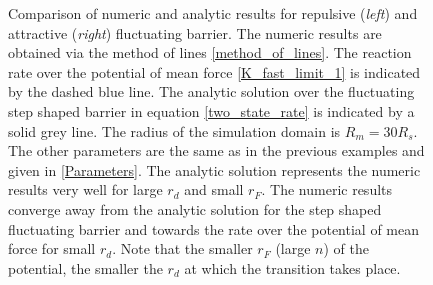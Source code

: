 \begin{minipage}[t]{1 \textwidth}
    \begin{figure}[H]
        \caption{Comparison of numeric and analytic results for repulsive (\emph{left}) and attractive (\emph{right}) fluctuating barrier. The numeric results are obtained via the method of lines \ref{method_of_lines}. The reaction rate over the potential of mean force \eqref{K_fast_limit_1} is indicated by the dashed blue line. The analytic solution over the fluctuating step shaped barrier in equation \eqref{two_state_rate} is indicated by a solid grey line. The radius of the simulation domain is $R_m=30 R_s$. The other parameters are the same as in the previous examples and given in \ref{Parameters}. The analytic solution represents the numeric results very well for large $r_d$ and small $r_F$. The numeric results converge away from the analytic solution for the step shaped fluctuating barrier and towards the rate over the potential of mean force for small $r_d$. Note that the smaller $r_F$ (large $n$) of the potential, the smaller the $r_d$ at which the transition takes place.\label{numeric}}
    \end{figure}
\end{minipage} \vspace{0.5 cm} \\

